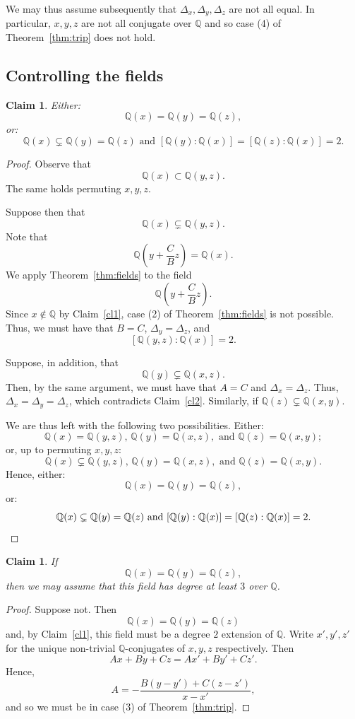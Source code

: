 \documentclass[11pt,a4paper, british]{amsart}
\newtheorem{claim}[thm]{Claim}
\theoremstyle{definition}
\theoremstyle{remark}
\numberwithin{equation}{section}
\newcommand{\Q}{\mathbb{Q}} %
\begin{document}
 We may thus assume subsequently that $\Delta_x, \Delta_y, \Delta_z$ are not all equal. In particular, $x, y, z$ are not all conjugate over $\Q$ and so case (4) of Theorem~\ref{thm:trip} does not hold. 

\subsection{Controlling the fields}\label{subsec:fields}

\begin{claim}\label{cl3}
	Either:
	\[ \Q(x) = \Q(y) = \Q(z),\]
	or:
	\[ \Q(x) \subsetneq \Q(y) = \Q(z) \mbox{ and } [\Q(y) : \Q(x)] = [\Q(z) : \Q(x)] = 2.\]
\end{claim}

\begin{proof}
Observe that
\[ \Q(x)  \subset \Q(y, z).\]
The same holds permuting $x, y, z$.

Suppose then that
\[ \Q(x) \subsetneq \Q(y, z).\]
Note that
\[ \Q\left(y + \frac{C}{B}z\right) = \Q(x).\]
We apply Theorem~\ref{thm:fields} to the field 
\[\Q\left(y + \frac{C}{B} z\right).\]
Since $x \notin \Q$ by Claim~\ref{cl1}, case (2) of Theorem~\ref{thm:fields} is not possible. Thus, we must have that $B = C$, $\Delta_y = \Delta_z$, and
\[ [\Q(y, z) : \Q(x)] = 2.\]

Suppose, in addition, that
\[ \Q(y) \subsetneq \Q(x, z).\]
Then, by the same argument, we must have that $A = C$ and $\Delta_x = \Delta_z$. Thus, $\Delta_x = \Delta_y = \Delta_z$, which contradicts Claim~\ref{cl2}. Similarly, if $\Q(z) \subsetneq \Q(x, y)$.

We are thus left with the following two possibilities. Either:
\[ \Q(x) = \Q(y, z), \, \Q(y) = \Q(x, z), \mbox{ and } \Q(z) = \Q(x, y);\]
or, up to permuting $x, y, z$:
\[\Q(x) \subsetneq \Q(y, z), \, \Q(y) = \Q(x, z), \mbox{ and } \Q(z) = \Q(x, y). \]
Hence, either:
\[ \Q(x) = \Q(y) = \Q(z),\]
or:
\[ \Q(x) \subsetneq \Q(y) = \Q(z) \mbox{ and } [\Q(y) : \Q(x)] = [\Q(z) : \Q(x)] = 2. \qedhere\]
\end{proof}

\begin{claim}\label{cl4}
	If 
	\[ \Q(x) = \Q(y) = \Q(z),\]
	then we may assume that this field has degree at least $3$ over $\Q$.
\end{claim}

\begin{proof}

Suppose not. Then 
\[ \Q(x) = \Q(y) = \Q(z)\]
and, by Claim~\ref{cl1}, this field must be a degree $2$ extension of $\Q$. Write $x', y', z'$ for the unique non-trivial $\Q$-conjugates of $x, y, z$ respectively. Then
\[Ax + By + Cz = Ax' + By' + Cz'.\]
Hence,
\[A = -\frac{B(y-y')+C(z-z')}{x-x'},\]
and so we must be in case (3) of Theorem~\ref{thm:trip}.
\end{proof} 
\end{document}
